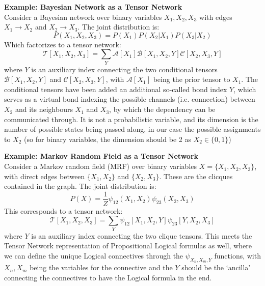 \documentclass[encoding=utf8,british]{tumphthesis}
\begin{document}
            \textbf{Example: Bayesian Network as a Tensor Network} \\
            Consider a Bayesian network over binary variables $X_1, X_2, X_3$ with edges $X_1 \rightarrow X_2$ and $X_2 \rightarrow X_3$. 
            The joint distribution is:
            \begin{equation}
                P(X_1, X_2, X_3) = P(X_1)P(X_2|X_1)P(X_3|X_2)
            \end{equation}
            Which factorizes to a tensor network:
            \begin{equation}
                \mathcal{T}[X_1, X_2, X_3] = \sum_{Y} \mathcal{A}[X_1]\mathcal{B}[X_1, X_2, Y]\mathcal{C}[X_2, X_3, Y]
            \end{equation}
            where $Y$ is an auxiliary index connecting the two conditional tensors 
            $\mathcal{B}[X_1, X_2, Y]$ and $\mathcal{C}[X_2, X_3, Y]$, with $\mathcal{A}[X_1]$ being the prior tensor to $X_1$. The conditional tensors 
            have been added an additional so-called bond index $Y$, which serves as a virtual bond indexing the possible channels (i.e. connection) between $X_2$ and its
            neighbours $X_1$ and $X_3$, by which the dependency can be communicated through. It is not a probabilistic variable, and its dimension is the number of possible 
            states being passed along, in our case the possible assignments to $X_2$ (so for binary variables, the dimension should be 2 as $X_2 \in \{0, 1\}$)

            \textbf{Example: Markov Random Field as a Tensor Network} \\
            Consider a Markov random field (MRF) over binary variables $X = \{X_1, X_2, X_3\}$, with direct edges between $\{X_1, X_2\}$ and $\{X_2, X_3\}$. These are the clicques contained 
            in the graph. The joint distribution is:
            \begin{equation}
                P(X) = \frac{1}{Z} \psi_{12}(X_1, X_2) \psi_{23}(X_2, X_3)
            \end{equation}
            This corresponds to a tensor network:
            \begin{equation}
                \mathcal{T}[X_1, X_2, X_3] = \sum_{Y} \psi_{12}[X_1, X_2, Y] \psi_{23}[Y, X_2, X_3]
            \end{equation}
            where $Y$ is an auxiliary index connecting the two clique tensors. This meets the Tensor Network representation of Propositional 
            Logical formulas as well, where we can define the unique Logical connectives through the $\psi_{X_n, X_m, Y}$ functions,
            with $X_n, X_m$ being the variables for the connective and the $Y$ should be the `ancilla' connecting the connectives to 
            have the Logical formula in the end.
\end{document}
